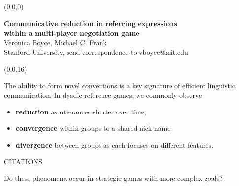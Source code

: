 \documentclass[10pt, xcolor=table, dvipsnames]{beamer}
\begin{document}
	\begin{textblock}{1}(0.0,0)
		\begin{tcolorbox}[colback=Violet!30]{}
			
			
			\begin{centering} 
				\bigskip
				
				{\LARGE\textbf{Communicative reduction in referring expressions \\ within a
						multi-player negotiation game}}\\
				{\Large Veronica Boyce, Michael C. Frank} \\
				{Stanford University, send correspondence to vboyce@mit.edu}	
				
			\end{centering}
		\end{tcolorbox}
	\end{textblock}
	
	\begin{textblock}{.32}(0,0.16)
		\begin{tcolorbox}[title= {\centering Goals }]
			\begin{small}\centering
				\bigskip
			The ability to form novel conventions is a key signature of efficient
			linguistic communication.
 In dyadic reference games, we commonly observe 
 \begin{itemize}
 	\item \textbf{reduction} as utterances shorter over time,
 	 \item \textbf{convergence} within groups to a shared nick name,
 	  \item \textbf{divergence} between groups as each focuses on different features.
   \end{itemize}  CITATIONS

Do these phenomena occur in strategic games with more complex goals?


			\end{small}
		\end{tcolorbox}
	\end{textblock}
	
	
\end{document}

